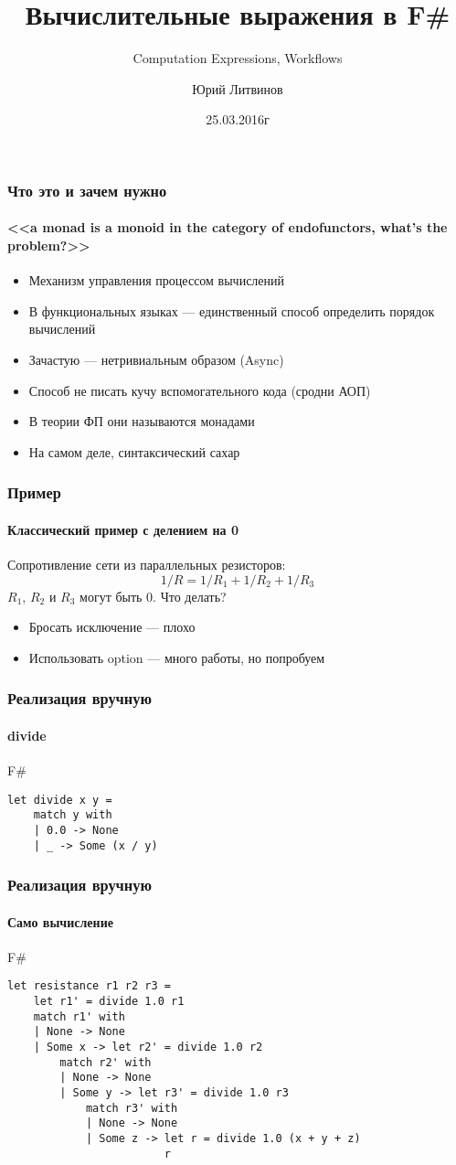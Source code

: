 \documentclass[xetex,mathserif,serif]{beamer}
\title{Вычислительные выражения в F\#}
\subtitle{Computation Expressions, Workflows}
\author{Юрий Литвинов}
\date{25.03.2016г}
\begin{document}
	
	\frame{\titlepage}
	
	\begin{frame}
		\frametitle{Что это и зачем нужно}
        \framesubtitle{<<a monad is a monoid in the category of endofunctors, what's the problem?>>}
        \begin{itemize}
            \item Механизм управления процессом вычислений
            \item В функциональных языках --- единственный способ определить порядок вычислений
            \item Зачастую --- нетривиальным образом (Async)
            \item Способ не писать кучу вспомогательного кода (сродни АОП)
            \item В теории ФП они называются монадами
            \item На самом деле, синтаксический сахар
        \end{itemize}
	\end{frame}	

	\begin{frame}
		\frametitle{Пример}
        \framesubtitle{Классический пример с делением на 0}
        Сопротивление сети из параллельных резисторов:
        $$1/R = 1/R_1 + 1/R_2 + 1/R_3$$
        $R_1$, $R_2$ и $R_3$ могут быть 0. Что делать?
        \begin{itemize}
            \item Бросать исключение --- плохо
            \item Использовать option --- много работы, но попробуем
        \end{itemize}
	\end{frame}	

	\begin{frame}[fragile]
		\frametitle{Реализация вручную}
        \framesubtitle{divide}
      		\begin{exampleblock}{F\#}
      			\begin{lstlisting}
let divide x y =
    match y with
    | 0.0 -> None
    | _ -> Some (x / y)
\end{lstlisting}
\end{exampleblock}
\end{frame}	

	\begin{frame}[fragile]
		\frametitle{Реализация вручную}
        \framesubtitle{Само вычисление}
      		\begin{exampleblock}{F\#}
      			\begin{lstlisting}
let resistance r1 r2 r3 =
    let r1' = divide 1.0 r1
    match r1' with
    | None -> None
    | Some x -> let r2' = divide 1.0 r2
        match r2' with
        | None -> None
        | Some y -> let r3' = divide 1.0 r3
            match r3' with
            | None -> None
            | Some z -> let r = divide 1.0 (x + y + z)
                        r
\end{lstlisting}
\end{exampleblock}
\end{frame}	
\end{document}
